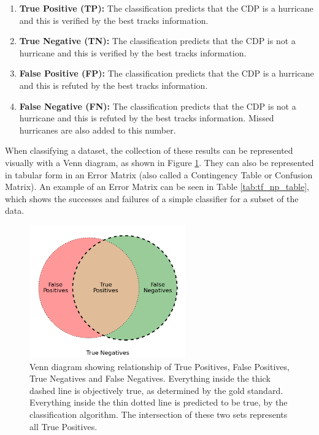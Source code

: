 \documentclass[pdftex,12pt,a4paper]{report}
\begin{document}
\begin{enumerate}
    \item \textbf{True Positive (TP):} The classification predicts that the CDP is a hurricane and
        this is verified by the best tracks information.
    \item \textbf{True Negative (TN):} The classification predicts that the CDP is not a hurricane
        and this is verified by the best tracks information.
    \item \textbf{False Positive (FP):} The classification predicts that the CDP is a hurricane and
        this is refuted by the best tracks information.
    \item \textbf{False Negative (FN):} The classification predicts that the CDP is not a hurricane
        and this is refuted by the best tracks information. Missed hurricanes are also added to this
        number.
\end{enumerate}

When classifying a dataset, the collection of these results can be represented visually with a Venn
diagram, as shown in Figure \ref{fig:tf_np_venn}. They can also be represented in tabular form in an
Error Matrix (also called a Contingency Table or Confusion Matrix). An example of an Error Matrix
can be seen in Table \ref{tab:tf_np_table}, which shows the successes and failures of a simple
classifier for a subset of the data.

\begin{figure}[hb!]
    \centering
    \includegraphics[width=0.6\textwidth]{figures/tf_np_venn_cropped}
    \vspace{-10pt}
    \caption{Venn diagram showing relationship of True Positives, False Positives, True Negatives and
        False Negatives. Everything inside the thick dashed line is objectively true, as determined
        by the gold standard. Everything inside the thin dotted line is predicted to be true, by the
        classification algorithm. The intersection of these two sets represents all True Positives.}
    \label{fig:tf_np_venn}
    \vspace{-10pt}
\end{figure}
\end{document}
